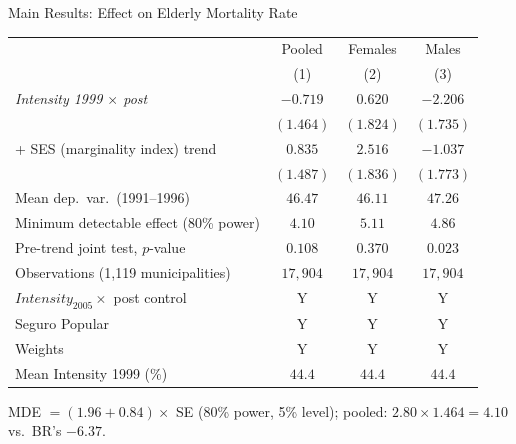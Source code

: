 \documentclass[aspectratio=169,usenames,dvipsnames]{beamer}
\begin{document}
\begin{frame}{Main Results: Effect on Elderly Mortality Rate}\label{main_results}
\vspace{-2pt}
\begin{center}
\footnotesize
\begin{tabular}{lccc}
\toprule\toprule
 & Pooled & Females & Males \\
 & (1) & (2) & (3) \\
\midrule
\textit{Intensity 1999 $\times$ post} & $-0.719$ & $0.620$ & $-2.206$ \\
 & $(1.464)$ & $(1.824)$ & $(1.735)$ \\[4pt]
\quad + SES (marginality index) trend & $0.835$ & $2.516$ & $-1.037$ \\
 & $(1.487)$ & $(1.836)$ & $(1.773)$ \\
\midrule
Mean dep.\ var.\ (1991--1996) & $46.47$ & $46.11$ & $47.26$ \\
Minimum detectable effect (80\% power) & $4.10$ & $5.11$ & $4.86$ \\
Pre-trend joint test, $p$-value & $0.108$ & $0.370$ & $0.023$ \\
Observations (1,119 municipalities) & $17{,}904$ & $17{,}904$ & $17{,}904$ \\
\midrule
$\textit{Intensity}_{2005} \times$ post control & Y & Y & Y \\
Seguro Popular & Y & Y & Y \\
Weights & Y & Y & Y \\
Mean Intensity 1999 (\%) & $44.4$ & $44.4$ & $44.4$ \\
\bottomrule\bottomrule
\end{tabular}

\vspace{2pt}
{\scriptsize MDE $= (1.96 + 0.84) \times$ SE (80\% power, 5\% level); pooled: $2.80 \times 1.464 = 4.10$ vs.\ BR's $-6.37$.}
\end{center}
\end{frame}

\end{document}
